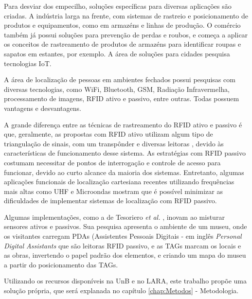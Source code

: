 Para desviar dos empecilho, soluções específicas para diversas aplicações são criadas. A indústria larga na frente, com sistemas de rastreio e posicionamento de produtos e equipamentos, como em armazéns e linhas de produção. O comércio também já possui soluções para prevenção de perdas e roubos, e começa a aplicar os conceitos de rastreamento de produtos de armazéns para identificar roupas e sapatos em estantes, por exemplo. A área de soluções para cidades pesquisa tecnologias IoT.

A área de localização de pessoas em ambientes fechados possui pesquisas com diversas tecnologias, como WiFi, Bluetooth, GSM, Radiação Infravermelha, processamento de imagens, RFID ativo e passivo, entre outras. Todas possuem vantagens e desvantagens.

A grande diferença entre as técnicas de rastreamento do RFID ativo e passivo é que, geralmente, as propostas com RFID ativo utilizam algum tipo de triangulação de sinais, com um transpônder e diversas leitoras \cite{bouet2008rfid} \cite{jin2006indoor} \cite{sanpechuda2008review}, devido às características de funcionamento desse sistema. As estratégias com RFID passivo costumam necessitar de pontos de interrogação e controle de acesso para funcionar, devido ao curto alcance da maioria dos sistemas. Entretanto, algumas aplicações funcionais de localização cartesiana recentes utilizando frequências mais altas como UHF e Microondas \cite{xarray} mostram que é possível minimizar as dificuldades de implementar sistemas de localização com RFID passivo.

Algumas implementações, como a de Tesoriero \textit{et al.} \cite{tesoriero2008using}, inovam ao misturar sensores ativos e passivos. Sua pesquisa apresenta o ambiente de um museu, onde os visitantes carregam PDAs (Assistentes Pessoais Digitais - em inglês \textit{Personal Digital Assistants} que são leitoras RFID passivo, e as TAGs marcam os locais e as obras, invertendo o papel padrão dos elementos, e criando um mapa do museu a partir do posicionamento das TAGs.

Utilizando os recursos disponíveis na UnB e no LARA, este trabalho propõe uma solução própria, que será explanada no capítulo \ref{chap:Metodos} - Metodologia.
